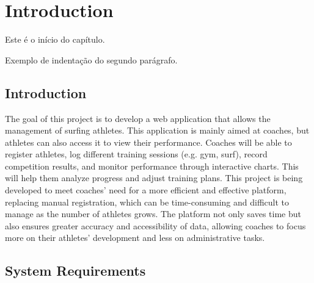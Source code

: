 %
%
\chapter{Introduction} \label{cap:introduction}

Este é o início do capítulo.

Exemplo de indentação do segundo parágrafo.

%
%
\section{Introduction} \label{sec11}

The goal of this project is to develop a web application that allows the management of surfing athletes. This application is mainly aimed at coaches, but athletes can also access it to view their performance. Coaches will be able to register athletes, log different training sessions (e.g. gym, surf), record competition results, and monitor
performance through interactive charts. This will help them analyze progress and adjust training plans. This project is being developed to meet coaches' need for a more efficient and effective platform, replacing manual registration, which can be time-consuming and difficult to manage as the number of athletes grows. The platform not only saves time but also ensures greater accuracy and accessibility of data, allowing coaches to focus more on their athletes’ development and less on administrative tasks.


%
%
\section{System Requirements} \label{sec12}

%
%
